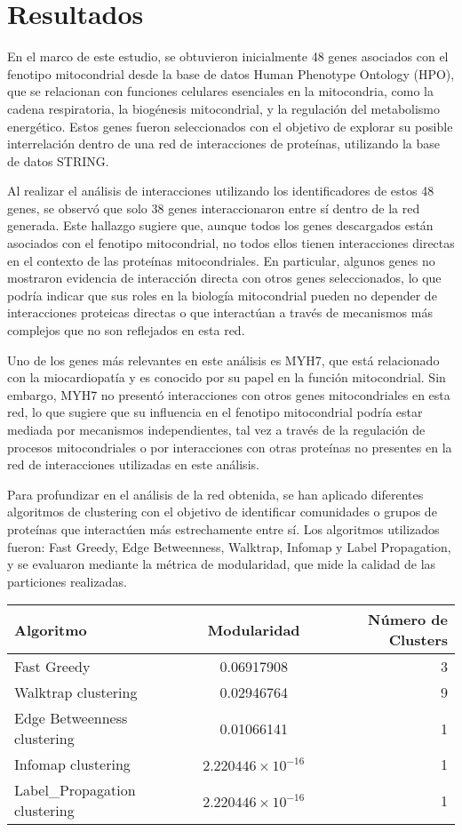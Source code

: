 
\section{Resultados}


En el marco de este estudio, se obtuvieron inicialmente 48 genes asociados con el fenotipo mitocondrial desde la base de datos Human Phenotype Ontology (HPO), que se relacionan con funciones celulares esenciales en la mitocondria, como la cadena respiratoria, la biogénesis mitocondrial, y la regulación del metabolismo energético. Estos genes fueron seleccionados con el objetivo de explorar su posible interrelación dentro de una red de interacciones de proteínas, utilizando la base de datos STRING.

Al realizar el análisis de interacciones utilizando los identificadores de estos 48 genes, se observó que solo 38 genes interaccionaron entre sí dentro de la red generada. Este hallazgo sugiere que, aunque todos los genes descargados están asociados con el fenotipo mitocondrial, no todos ellos tienen interacciones directas en el contexto de las proteínas mitocondriales. En particular, algunos genes no mostraron evidencia de interacción directa con otros genes seleccionados, lo que podría indicar que sus roles en la biología mitocondrial pueden no depender de interacciones proteicas directas o que interactúan a través de mecanismos más complejos que no son reflejados en esta red.


Uno de los genes más relevantes en este análisis es MYH7, que está relacionado con la miocardiopatía y es conocido por su papel en la función mitocondrial. Sin embargo, MYH7 no presentó interacciones con otros genes mitocondriales en esta red, lo que sugiere que su influencia en el fenotipo mitocondrial podría estar mediada por mecanismos independientes, tal vez a través de la regulación de procesos mitocondriales o por interacciones con otras proteínas no presentes en la red de interacciones utilizadas en este análisis.


Para profundizar en el análisis de la red obtenida, se han aplicado diferentes algoritmos de clustering con el objetivo de identificar comunidades o grupos de proteínas que interactúen más estrechamente entre sí. Los algoritmos utilizados fueron: Fast Greedy, Edge Betweenness, Walktrap, Infomap y Label Propagation, y se evaluaron mediante la métrica de modularidad, que mide la calidad de las particiones realizadas.
\vspace{1em}

\begin{tabular}{|l|c|r|}
	\hline
	\textbf{Algoritmo} & \textbf{Modularidad} & \textbf{Número de Clusters} \\
	\hline
	Fast Greedy & 0.06917908 & 3 \\
	\hline
	Walktrap clustering & 0.02946764 & 9 \\
	\hline
	Edge Betweenness clustering & 0.01066141 & 1 \\
	\hline
	Infomap clustering & \(2.220446 \times 10^{-16}\) & 1 \\
	\hline
	Label\_Propagation clustering & \(2.220446 \times 10^{-16}\) & 1 \\
	\hline
\end{tabular}


